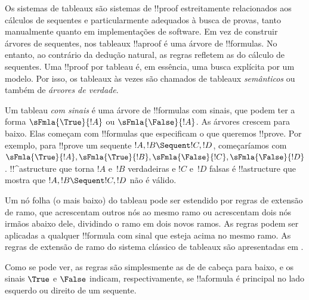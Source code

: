 \documentclass[../../../include/open-logic-section]{subfiles}
\begin{document}


Os sistemas de tableaux são sistemas de !!{proof} estreitamente
relacionados aos cálculos de sequentes e particularmente adequados à
busca de provas, tanto manualmente quanto em implementações de software.
Em vez de construir árvores de sequentes, nos tableaux !!a{proof} é uma
árvore de !!{formula}s. No entanto, ao contrário da dedução natural, as
regras refletem as do cálculo de sequentes. Uma !!{proof} por tableau é,
em essência, uma busca explícita por um modelo. Por isso, os tableaux às
vezes são chamados de tableaux \emph{semânticos} ou também de
\emph{árvores de verdade}.

Um tableau \emph{com sinais} é uma árvore de !!{formula}s com sinais,
que podem ter a forma $\sFmla{\True}{!A}$ ou $\sFmla{\False}{!A}$. As
árvores crescem para baixo. Elas começam com !!{formula}s que especificam
o que queremos !!{prove}. Por exemplo, para !!{prove} um sequente $!A,
!B \Sequent !C, !D$, começaríamos com $\sFmla{\True}{!A},
\sFmla{\True}{!B}, \sFmla{\False}{!C}, \sFmla{\False}{!D}$.
!!^a{structure} que torna $!A$ e~$!B$ verdadeiras e $!C$ e~$!D$ falsas
é !!a{structure} que mostra que $!A, !B \Sequent !C, !D$ não é
válido. 

Um nó folha (o mais baixo) do tableau pode ser estendido por regras de
extensão de ramo, que acrescentam outros nós ao mesmo ramo ou acrescentam
dois nós irmãos abaixo dele, dividindo o ramo em dois novos ramos. As
regras podem ser aplicadas a qualquer !!{formula} com sinal que esteja
acima no mesmo ramo. As regras de extensão de ramo do sistema clássico
de tableaux  são apresentadas em .



Como se pode ver, as regras são simplesmente as de  de cabeça
para baixo, e os sinais $\True$ e $\False$ indicam, respectivamente, se
!!a{formula} é principal no lado esquerdo ou direito de um sequente.
\end{document}
